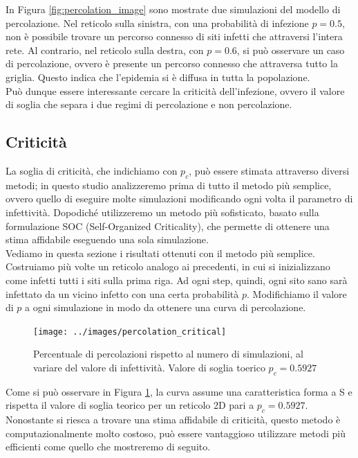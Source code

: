 \documentclass{article}
\begin{document}
    In Figura \ref{fig:percolation_image} sono mostrate due simulazioni del modello di percolazione. Nel reticolo sulla
    sinistra, con una probabilità di infezione $p=0.5$, non è possibile trovare un percorso connesso di siti infetti che
    attraversi l'intera rete. Al contrario, nel reticolo sulla destra, con $p=0.6$, si può osservare un caso di percolazione,
    ovvero è presente un percorso connesso che attraversa tutto la griglia. Questo indica che l'epidemia si è diffusa in
    tutta la popolazione.\\
    Può dunque essere interessante cercare la criticità dell'infezione, ovvero il valore di soglia che separa i due
    regimi di percolazione e non percolazione.
    \subsection{Criticità}
    La soglia di criticità, che indichiamo con $p_c$, può essere stimata attraverso diversi metodi; in questo studio
    analizzeremo prima di tutto il metodo più semplice, ovvero quello di eseguire molte simulazioni modificando ogni
    volta il parametro di infettività.
    Dopodiché utilizzeremo un metodo più sofisticato, basato sulla formulazione SOC (Self-Organized Criticality), che
    permette di ottenere una stima affidabile eseguendo una sola simulazione.\\
    Vediamo in questa sezione i risultati ottenuti con il metodo più semplice. Costruiamo più volte un reticolo
    analogo ai precedenti, in cui si inizializzano come infetti tutti i siti sulla prima riga. Ad ogni step, quindi,
    ogni sito sano sarà infettato da un vicino infetto con una certa probabilità $p$. Modifichiamo il valore di $p$ a
    ogni simulazione in modo da ottenere una curva di percolazione.
    \begin{figure}[H]
        \centering
        \texttt{[image: ../images/percolation\_critical]}
        \caption{Percentuale di percolazioni rispetto al numero di simulazioni, al variare del valore di infettività.
                    Valore di soglia toerico $p_c=0.5927$}
        \label{fig:percolation_critical}
    \end{figure}
    Come si può osservare in Figura \ref{fig:percolation_critical}, la curva assume una caratteristica forma a S e rispetta
    il valore di soglia teorico per un reticolo 2D pari a $p_c = 0.5927$.
    Nonostante si riesca a trovare una stima affidabile di criticità, questo metodo è computazionalmente molto costoso,
    può essere vantaggioso utilizzare metodi più efficienti come quello che mostreremo di seguito.
\end{document}
